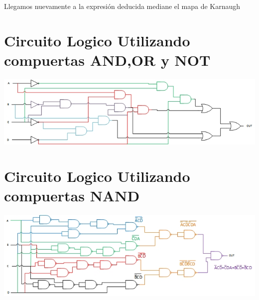 Llegamos nuevamente a la expresión deducida mediane el mapa de 
Karnaugh

\section{Circuito Logico Utilizando compuertas AND,OR y NOT}

\includegraphics[width=\textwidth]{Ejercicios/Drawing1.jpg}

\section{Circuito Logico Utilizando compuertas NAND}

\includegraphics[width=\textwidth]{Ejercicios/circuito2.jpg}
 